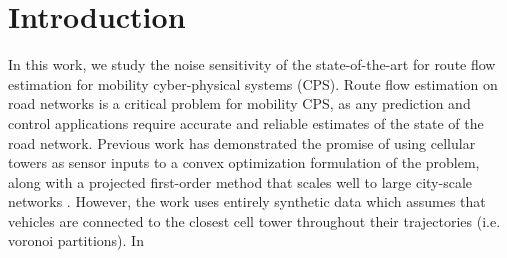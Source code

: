 
\section{Introduction}
In this work, we study the noise sensitivity of the state-of-the-art for route flow estimation for mobility cyber-physical systems (CPS). Route flow estimation on road networks is a critical problem for mobility CPS, as any prediction and control applications require accurate and reliable estimates of the state of the road network. Previous work has demonstrated the promise of using cellular towers as sensor inputs to a convex optimization formulation of the problem, along with a projected first-order method that scales well to large city-scale networks \cite{Wu2015}. However, the work uses entirely synthetic data which assumes that vehicles are connected to the closest cell tower throughout their trajectories (i.e. voronoi partitions). In
